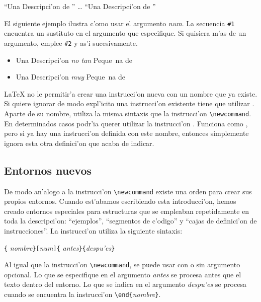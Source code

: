 \begin{example}
\newcommand{\udl}
    {Una Descripci'on de \LaTeXe}
``\udl'' \ldots{} ``\udl''
\end{example}

El siguiente ejemplo ilustra c'omo usar el argumento \emph{num}. La
secuencia \verb|#1| encuentra un sustituto en el argumento que
especifique. Si quisiera m'as de un argumento, emplee \verb|#2| y as'i
sucesivamente.

\begin{example}
\newcommand{\txsit}[1]
    {Una Descripci'on \emph{#1}
     Peque~na de \LaTeXe}
\begin{itemize}
\item \txsit{no tan}
\item \txsit{muy}
\end{itemize}
\end{example}

\LaTeX{} no le permitir'a crear una instrucci'on nueva con un nombre
que ya existe. Si quiere ignorar de modo expl'icito una instrucci'on
existente tiene que utilizar . Aparte de su nombre,
utiliza la misma sintaxis que la instrucci'on \verb|\newcommand|. En
determinados casos podr'ia querer utilizar la instrucci'on
. Funciona como , pero si ya hay una
instrucci'on definida con este nombre, entonces \LaTeXe{} simplemente
ignora esta otra definici'on que acaba de indicar.


\subsection{Entornos nuevos}
De modo an'alogo a la instrucci'on \verb|\newcommand| existe una orden
para crear sus propios entornos. Cuando est'abamos escribiendo esta
introducci'on, hemos creado entornos especiales para estructuras que
se empleaban repetidamente en toda la descripci'on: ``ejemplos'',
``segmentos de c'odigo'' y ``cajas de definici'on de instrucciones''.
La instrucci'on  utiliza la siguiente sintaxis:

\begin{command}
\verb|{|%
       \emph{nombre}\verb|}[|\emph{num}\verb|]{|%
       \emph{antes}\verb|}{|\emph{despu'es}\verb|}|
\end{command}

Al igual que la instrucci'on \verb|\newcommand|, se puede usar
 con o sin argumento opcional. Lo que se
especifique en el argumento \emph{antes} se procesa antes que el texto
dentro del entorno. Lo que se indica en el argumento \emph{despu'es}
se procesa cuando se encuentra la instrucci'on
\verb|\end{|\emph{nombre}\verb|}|.

